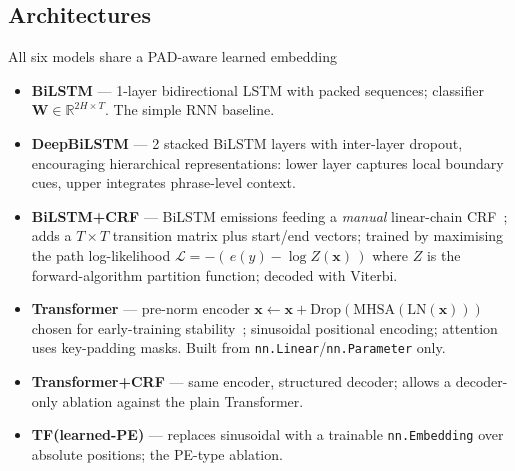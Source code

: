 \documentclass[10pt,a4paper,twocolumn]{article}
\begin{document}
\subsection*{Architectures}
All six models share a PAD-aware learned embedding \begin{itemize}
    \item \textbf{BiLSTM} \citep{Hochreiter1997} — 1-layer bidirectional LSTM with
    packed sequences; classifier $\mathbf{W}\!\in\!\mathbb{R}^{2H\times T}$.
    The simple RNN baseline.
    
    \item \textbf{DeepBiLSTM} \citep{Ma2016} — 2 stacked BiLSTM layers with inter-layer
    dropout, encouraging hierarchical representations: lower layer captures local
    boundary cues, upper integrates phrase-level context.
    
    \item \textbf{BiLSTM+CRF} \citep{Huang2015,Lample2016} — BiLSTM emissions feeding a
    \emph{manual} linear-chain CRF~\citep{Lafferty2001}; adds a $T{\times}T$
    transition matrix plus start/end vectors; trained by maximising the path
    log-likelihood
    $\mathcal{L}=-(\,e(y)-\log Z(\mathbf{x})\,)$ where $Z$ is the
    forward-algorithm partition function; decoded with Viterbi.
    
    \item \textbf{Transformer} \citep{Vaswani2017} — pre-norm encoder
    $\mathbf{x}\!\leftarrow\!\mathbf{x}+\text{Drop}(\text{MHSA}(\text{LN}(\mathbf{x})))$
    chosen for early-training stability~\citep{Xiong2020}; sinusoidal positional
    encoding; attention uses key-padding masks. Built from
    \texttt{nn.Linear}/\texttt{nn.Parameter} only.
    
    \item \textbf{Transformer+CRF} — same encoder, structured decoder; allows a
    decoder-only ablation against the plain Transformer.
    
    \item \textbf{TF(learned-PE)} — replaces sinusoidal with a trainable
    \texttt{nn.Embedding} over absolute positions; the PE-type ablation.
\end{itemize}
\end{document}
